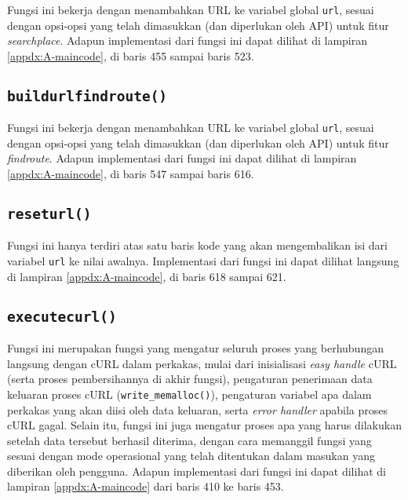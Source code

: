Fungsi ini bekerja dengan menambahkan URL ke variabel global \verb|url|, sesuai dengan opsi-opsi yang telah dimasukkan (dan diperlukan oleh API) untuk fitur \textit{searchplace}. Adapun implementasi dari fungsi ini dapat dilihat di lampiran \ref{appdx:A-maincode}, di baris 455 sampai baris 523.

\subsection{\texttt{build\textunderscore url\textunderscore findroute()}}
\label{sec:testing-implementation-buildurl-findroute}

Fungsi ini bekerja dengan menambahkan URL ke variabel global \verb|url|, sesuai dengan opsi-opsi yang telah dimasukkan (dan diperlukan oleh API) untuk fitur \textit{findroute}. Adapun implementasi dari fungsi ini dapat dilihat di lampiran \ref{appdx:A-maincode}, di baris 547 sampai baris 616.

\subsection{\texttt{reset\textunderscore url()}}
\label{sec:testing-implementation-buildurl-reset}

Fungsi ini hanya terdiri atas satu baris kode yang akan mengembalikan isi dari variabel \verb|url| ke nilai awalnya. Implementasi dari fungsi ini dapat dilihat langsung di lampiran \ref{appdx:A-maincode}, di baris 618 sampai 621.
	
\subsection{\texttt{execute\textunderscore curl()}}
\label{sec:testing-implementation-curl-execute}

Fungsi ini merupakan fungsi yang mengatur seluruh proses yang berhubungan langsung dengan cURL dalam perkakas, mulai dari inisialisasi \textit{easy handle} cURL (serta proses pembersihannya di akhir fungsi), pengaturan penerimaan data keluaran proses cURL (\verb|write_memalloc()|), pengaturan variabel apa dalam perkakas yang akan diisi oleh data keluaran, serta \textit{error handler} apabila proses cURL gagal. Selain itu, fungsi ini juga mengatur proses apa yang harus dilakukan setelah data tersebut berhasil diterima, dengan cara memanggil fungsi yang sesuai dengan mode operasional yang telah ditentukan dalam masukan yang diberikan oleh pengguna. Adapun implementasi dari fungsi ini dapat dilihat di lampiran \ref{appdx:A-maincode} dari baris 410 ke baris 453.

